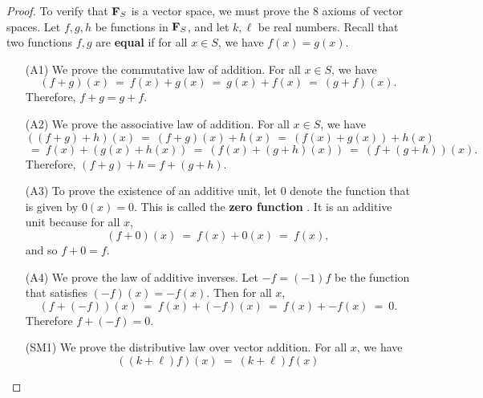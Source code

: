 \begin{proof}
  To verify that $\mathbf{F}_S$ is a vector space, we must prove the 8
  axioms of vector spaces. Let $f, g, h$ be functions in $\mathbf{F}_S$,
  and let $k,\ell$ be real numbers. Recall that two functions $f,g$
  are \textbf{equal}%
   if for all $x\in S$, we have
  $f(x)=g(x)$.

  \begin{itemize}
  \item[(A1)] We prove the commutative law of addition. For all
    $x\in S$, we have
    \begin{equation*}
      (f + g) (x)
      ~=~ f(x) + g(x)
      ~=~ g(x) + f(x)
      ~=~ (g + f) (x).
    \end{equation*}
    Therefore, $f + g = g + f$.
  \item[(A2)] We prove the associative law of addition. For all
    $x\in S$, we have
    \begin{equation*}
      ((f + g) + h) (x)
      ~=~ (f + g) (x) + h(x)
      ~=~ (f(x) + g(x)) + h(x)
    \end{equation*}
    \begin{equation*}
      ~=~ f(x) + (g(x) + h(x))
      ~=~ (f(x) + (g + h) (x))
      ~=~ (f + (g + h)) (x).
    \end{equation*}
    Therefore, $(f + g) + h = f + (g + h)$.
  \item[(A3)] To prove the existence of an additive unit, let $0$
    denote the function that is given by $0(x)=0$. This is called the
    \textbf{zero function}%
    . It is an additive unit because for all $x$,
    \begin{equation*}
      (f + 0) (x)
      ~=~ f(x) + 0(x)
      ~=~ f(x),
    \end{equation*}
    and so $f+0 = f$.
  \item[(A4)] We prove the law of additive inverses. Let $-f = (-1)f$
    be the function that satisfies $(-f) (x) = -f(x)$. Then for all $x$,
    \begin{equation*}
      (f + (-f)) (x)
      ~=~ f(x) + (-f) (x)
      ~=~ f(x) + -f(x)
      ~=~ 0.
    \end{equation*}
    Therefore $f + (-f) = 0$.
  \item[(SM1)] We prove the distributive law over vector addition. For
    all $x$, we have
    \begin{equation*}
      ((k + \ell ) f) (x)
      ~=~ (k + \ell ) f(x)

\end{equation*}
\end{itemize}
\end{proof}
